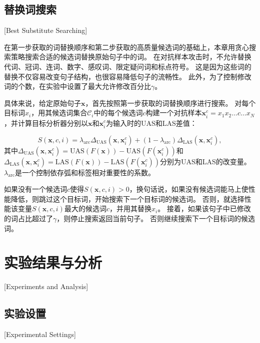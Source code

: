 \subsection{替换词搜索}[Best Substitute Searching]

在第一步获取的词替换顺序和第二步获取的高质量候选词的基础上，本章用贪心搜索策略搜索合适的候选词替换原始句子中的词。
在对抗样本攻击时，不允许替换代词、冠词、连词、数字、感叹词、限定疑问词和标点符号。
这是因为这些词的替换不仅容易改变句子结构，也很容易降低句子的流畅性。
此外，为了控制修改词的个数，在实验中设置了最大允许修改百分比$\gamma$。 %

具体来说，给定原始句子$\bm{x}$，首先按照第一步获取的词替换顺序进行搜索。
对每个目标词$x_i$，用其候选词集合$\mathcal{C}_i$中的每个候选词$c$构建一个对抗样本$\bm{x}^c_{i} = x_1x_2\dots c\dots x_N$，并计算目标分析器分别以$\bm{x}$和$\bm{x}^c_{i}$为输入时的UAS和LAS差值：

\begin{equation}
	\label{eq:mis-inc}
	S(\bm{x},c,i) =  \lambda_{\text{arc}}\Delta_\text{UAS}(\bm{x},\bm{x}^c_{i}) +
	 (1-\lambda_{\text{arc}})\Delta_\text{LAS}(\bm{x},\bm{x}^c_{i}),
\end{equation}
其中$\Delta_\text{UAS}(\bm{x},\bm{x}^c_{i}) = \text{UAS}(F(\bm{x})) - \text{UAS}(F(\bm{x}^c_{i})) $和$\Delta_\text{LAS}(\bm{x},\bm{x}^c_{i}) = \text{LAS}(F(\bm{x})) - \text{LAS}(F(\bm{x}^c_{i}))$分别为UAS和LAS的改变量。 
$\lambda_{\text{arc}}$是一个控制依存弧和标签相对重要性的系数。%

如果没有一个候选词$c$使得$S(\bm{x},c,i) > 0$，换句话说，如果没有候选词能马上使性能降低，则跳过这个目标词，开始搜索下一个目标词的候选词。
否则，就选择性能该变量$S(\bm{x},c,i)$最大的候选词$c$，并用其替换$x_i$。
接着，如果该句子中已修改的词占比超过了$\gamma$，则停止搜索返回当前句子。
否则继续搜索下一个目标词的候选词。


\section{实验结果与分析}[Experiments and Analysis]

\subsection{实验设置}[Experimental Settings]

